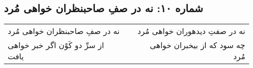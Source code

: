 \begin{center}
\section*{شماره ۱۰: نه در صفِ صاحبنظران خواهی مُرد}
\label{sec:010}
\begin{longtable}{l p{0.5cm} r}
نه در صفِ صاحبنظران خواهی مُرد
&&
نه در صفتِ دیدهوران خواهی مُرد
\\
از سرِّ دو کَوْن اگر خبر خواهی یافت
&&
چه سود که از بیخبران خواهی مُرد
\\
\end{longtable}
\end{center}
